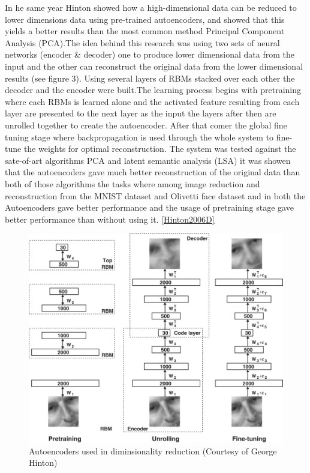 \documentclass[12pt,twoside]{article}
\theoremstyle{plain}
\theoremstyle{definition}
\theoremstyle{remark}
\begin{document}
In he same year Hinton \cite{HintonSalakhutdinov2006b} showed how a high-dimensional data can be reduced to lower dimensions data using pre-trained autoencoders, and showed that this yields a better results than the most common method Principal Component Analysis (PCA).The idea behind this research was using two sets of neural networks (encoder \& decoder) one to produce lower dimensional data from the input and the other can reconstruct the original data from the lower dimensional results (see figure 3). Using several layers of RBMs stacked over each other the decoder and the encoder were built.The learning process begins with pretraining where each RBMs is learned alone and the activated feature resulting from each layer are presented to the next layer as the input the layers  after then are unrolled together to create the autoencoder. After that comer the global fine tuning stage where backpropagation is used through the whole system to fine-tune the weights for optimal reconstruction. The system was tested against the sate-of-art algorithms PCA and latent semantic analysis (LSA) it was showen that the autoencoders gave much better reconstruction of the original data than both of those algorithms  the tasks where among image reduction and reconstruction from the MNIST dataset and Olivetti face dataset and in both the Autoencoders gave better performance and the usage of pretraining stage gave better performance than without using it.
\ref{Hinton2006D}
\begin{figure}[hbtp]
\caption{Autoencoders used in diminsionality reduction (Courtesy of George Hinton)}
\centering
\includegraphics[scale=.30]{Images/autoencoders.jpg}
\end{figure}
\end{document}
